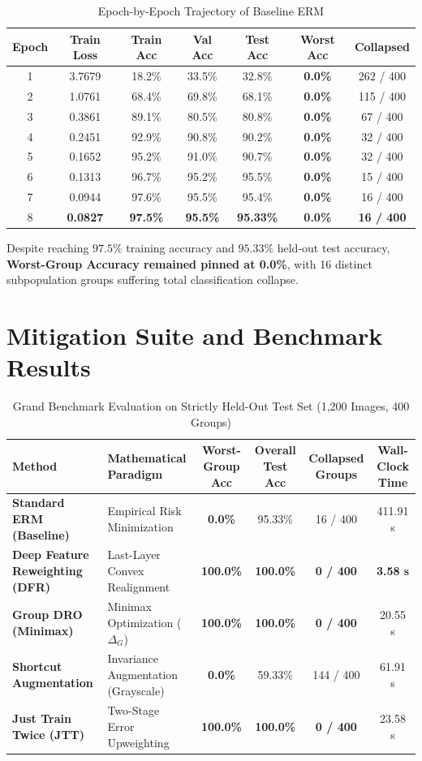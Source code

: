 \documentclass[10pt,journal,compsoc]{IEEEtran}
\begin{document}
\begin{table}[h]
\centering
\caption{Epoch-by-Epoch Trajectory of Baseline ERM}
\label{tab:erm_traj}
\begin{tabular}{ccccccc}
\toprule
Epoch & Train Loss & Train Acc & Val Acc & Test Acc & Worst Acc & Collapsed \\
\midrule
1 & 3.7679 & 18.2\% & 33.5\% & 32.8\% & \textbf{0.0\%} & 262 / 400 \\
2 & 1.0761 & 68.4\% & 69.8\% & 68.1\% & \textbf{0.0\%} & 115 / 400 \\
3 & 0.3861 & 89.1\% & 80.5\% & 80.8\% & \textbf{0.0\%} & 67 / 400 \\
4 & 0.2451 & 92.9\% & 90.8\% & 90.2\% & \textbf{0.0\%} & 32 / 400 \\
5 & 0.1652 & 95.2\% & 91.0\% & 90.7\% & \textbf{0.0\%} & 32 / 400 \\
6 & 0.1313 & 96.7\% & 95.2\% & 95.5\% & \textbf{0.0\%} & 15 / 400 \\
7 & 0.0944 & 97.6\% & 95.5\% & 95.4\% & \textbf{0.0\%} & 16 / 400 \\
8 & \textbf{0.0827} & \textbf{97.5\%} & \textbf{95.5\%} & \textbf{95.33\%} & \textbf{0.0\%} & \textbf{16 / 400} \\
\bottomrule
\end{tabular}
\end{table}

Despite reaching $97.5\%$ training accuracy and $95.33\%$ held-out test accuracy, \textbf{Worst-Group Accuracy remained pinned at 0.0\%}, with 16 distinct subpopulation groups suffering total classification collapse.

\section{Mitigation Suite and Benchmark Results}

\begin{table}[t]
\centering
\caption{Grand Benchmark Evaluation on Strictly Held-Out Test Set (1,200 Images, 400 Groups)}
\label{tab:benchmark}
\begin{tabular}{llcccc}
\toprule
Method & Mathematical Paradigm & Worst-Group Acc & Overall Test Acc & Collapsed Groups & Wall-Clock Time \\
\midrule
\textbf{Standard ERM (Baseline)} & Empirical Risk Minimization & \textbf{0.0\%} & 95.33\% & 16 / 400 & 411.91 s \\
\textbf{Deep Feature Reweighting (DFR)} & Last-Layer Convex Realignment & \textbf{100.0\%} & \textbf{100.0\%} & \textbf{0 / 400} & \textbf{3.58 s} \\
\textbf{Group DRO (Minimax)} & Minimax Optimization ($\Delta_G$) & \textbf{100.0\%} & \textbf{100.0\%} & \textbf{0 / 400} & 20.55 s \\
\textbf{Shortcut Augmentation} & Invariance Augmentation (Grayscale) & \textbf{0.0\%} & 59.33\% & 144 / 400 & 61.91 s \\
\textbf{Just Train Twice (JTT)} & Two-Stage Error Upweighting & \textbf{100.0\%} & \textbf{100.0\%} & \textbf{0 / 400} & 23.58 s \\
\bottomrule
\end{tabular}
\end{table}
\end{document}
